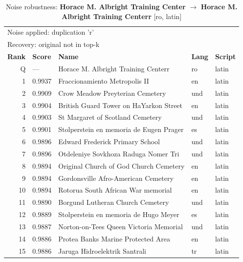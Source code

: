 \begin{table}[htbp]
\centering
\small
\caption{Noise robustness: \textbf{Horace M. Albright Training Center} $\rightarrow$ \textbf{Horace M. Albright Training Centerr} [ro, latin]}
\label{tab:noise-4}
\begin{tabular}{rllll}
\toprule
\multicolumn{5}{l}{\small Noise applied: duplication 'r'} \\
\multicolumn{5}{l}{\small Recovery: original not in top-k} \\
\midrule
\textbf{Rank} & \textbf{Score} & \textbf{Name} & \textbf{Lang} & \textbf{Script} \\
\midrule
\rowcolor{gray!20} Q & --- & Horace M. Albright Training Centerr & ro & latin \\
\midrule
1 & 0.9937 & Fraccionamiento Metropolis II & en & latin \\
2 & 0.9909 & Crow Meadow Preyterian Cemetery & und & latin \\
3 & 0.9904 & British Guard Tower on HaYarkon Street & en & latin \\
4 & 0.9903 & St Margaret of Scotland Cemetery & und & latin \\
5 & 0.9901 & Stolperstein en memoria de Eugen Prager & es & latin \\
6 & 0.9896 & Edward Frederick Primary School & und & latin \\
7 & 0.9896 & Otdeleniye Sovkhoza Raduga Nomer Tri & und & latin \\
8 & 0.9894 & Original Church of God Church Cemetery & en & latin \\
9 & 0.9894 & Gordonsville Afro-American Cemetery & en & latin \\
10 & 0.9894 & Rotorua South African War memorial & en & latin \\
11 & 0.9890 & Borgund Lutheran Church Cemetery & und & latin \\
12 & 0.9889 & Stolperstein en memoria de Hugo Meyer & es & latin \\
13 & 0.9887 & Norton-on-Tees Queen Victoria Memorial & und & latin \\
14 & 0.9886 & Protea Banks Marine Protected Area & en & latin \\
15 & 0.9886 & Jaruga Hidroelektrik Santrali & tr & latin \\
\bottomrule
\end{tabular}
\end{table}

